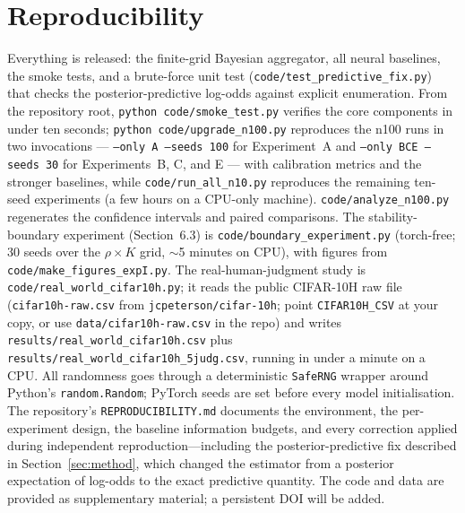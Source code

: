 \section*{Reproducibility}

{\sloppy
Everything is released: the finite-grid Bayesian aggregator, all neural
baselines, the smoke tests, and a brute-force unit test
(\texttt{code/test\_predictive\_fix.py}) that checks the
posterior-predictive log-odds against explicit enumeration. From the
repository root, \texttt{python code/smoke\_test.py} verifies the core
components in under ten seconds; \texttt{python code/upgrade\_n100.py}
reproduces the n100 runs in two invocations ---
\texttt{--only A --seeds 100} for Experiment~A and
\texttt{--only BCE --seeds 30} for Experiments~B, C, and E --- with
calibration metrics and the stronger baselines, while
\texttt{code/run\_all\_n10.py} reproduces the remaining ten-seed
experiments (a few hours on a CPU-only machine).
\texttt{code/analyze\_n100.py} regenerates the confidence intervals and
paired comparisons. The stability-boundary experiment (Section~6.3) is
\texttt{code/boundary\_experiment.py} (torch-free; 30 seeds over the
$\rho \times K$ grid, $\sim$5 minutes on CPU), with figures from
\texttt{code/make\_figures\_expI.py}. The real-human-judgment study is
\texttt{code/real\_world\_cifar10h.py}; it reads the public CIFAR-10H raw
file (\texttt{cifar10h-raw.csv} from \texttt{jcpeterson/cifar-10h};
point \texttt{CIFAR10H\_CSV} at your copy, or use
\texttt{data/cifar10h-raw.csv} in the repo) and writes
\texttt{results/real\_world\_cifar10h.csv} plus
\texttt{results/real\_world\_cifar10h\_5judg.csv}, running in under a
minute on a CPU. All randomness goes through a deterministic
\texttt{SafeRNG} wrapper around Python's \texttt{random.Random}; PyTorch
seeds are set before every model initialisation. The repository's
\texttt{REPRODUCIBILITY.md} documents the environment, the per-experiment
design, the baseline information budgets, and every correction applied
during independent reproduction---including the posterior-predictive fix
described in Section~\ref{sec:method}, which changed the estimator from a
posterior expectation of log-odds to the exact predictive quantity. The
code and data are provided as supplementary material; a persistent DOI
will be added.

}
